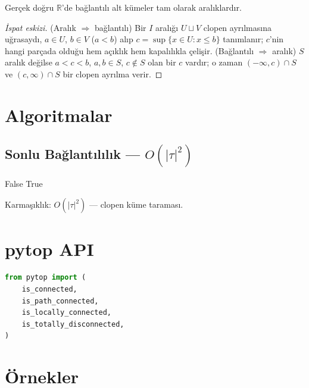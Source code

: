 \begin{theorem}
Gerçek doğru $\mathbb{R}$'de bağlantılı alt kümeler tam olarak aralıklardır.
\end{theorem}

\begin{proof}[İspat eskizi]
(Aralık $\Rightarrow$ bağlantılı) Bir $I$ aralığı $U \sqcup V$ clopen ayrılmasına
uğrasaydı, $a\in U$, $b\in V$ ($a<b$) alıp $c=\sup\{x\in U : x\le b\}$ tanımlanır;
$c$'nin hangi parçada olduğu hem açıklık hem kapalılıkla çelişir. (Bağlantılı
$\Rightarrow$ aralık) $S$ aralık değilse $a<c<b$, $a,b\in S$, $c\notin S$ olan bir
$c$ vardır; o zaman $(-\infty,c)\cap S$ ve $(c,\infty)\cap S$ bir clopen ayrılma verir.
\end{proof}

\section{Algoritmalar}

\subsection{Sonlu Bağlantılılık — $O(|\tau|^2)$}

\begin{algorithm}
\caption{BagliMi$(X, \tau)$}
\begin{algorithmic}[1]
        \State \Return False 
    \EndIf
\EndFor
\State \Return True
\end{algorithmic}
\end{algorithm}

Karmaşıklık: $O(|\tau|^2)$ — clopen küme taraması.

\section{pytop API}

\begin{lstlisting}[language=Python]
from pytop import (
    is_connected,
    is_path_connected,
    is_locally_connected,
    is_totally_disconnected,
)
\end{lstlisting}

\section{Örnekler}

